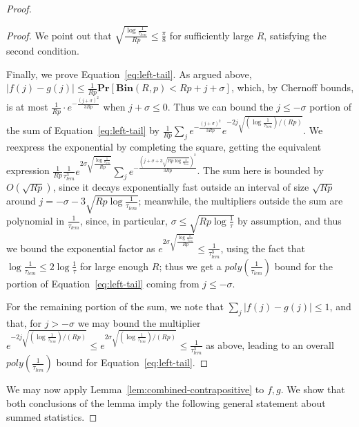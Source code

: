 \documentclass[11pt]{article}
\theoremstyle{plain}
\newcommand{\Bin}[2]{\textbf{Bin}(#1,#2)}
\renewcommand{\Pr}{\textbf{Pr}}
\begin{document}
\begin{proof}
\begin{proof}
    We point out that $\sqrt{\frac{\log\frac{1}{\tau_{lem}}}{Rp}}\leq \frac{\pi}{8}$ for sufficiently large $R$, satisfying the second condition.

    Finally, we prove Equation~\ref{eq:left-tail}. As argued above, $|f(j)-g(j)|\leq \frac{1}{Rp}\Pr[\Bin{R}{p}<Rp+j+\sigma]$, which, by Chernoff bounds, is at most $\frac{1}{Rp}\cdot e^{-\frac{(j+\sigma)^2}{3Rp}}$ when $j+\sigma\leq 0$. Thus we can bound the $j\leq -\sigma$ portion of the sum of Equation~\ref{eq:left-tail} by $\frac{1}{Rp}\sum_j e^{-\frac{(j+\sigma)^2}{3Rp}}e^{-2j\sqrt{(\log\frac{1}{\tau_{lem}})/(Rp)}}$. We reexpress the exponential by completing the square, getting the equivalent expression $\frac{1}{Rp}\frac{1}{\tau_{lem}^3}e^{2\sigma\sqrt{\frac{\log\frac{1}{\tau_{lem}}}{Rp}}}\sum_j e^{-\frac{\left(j+\sigma+3\sqrt{Rp\log\frac{1}{\tau_{lem}}}\right)^2}{3Rp}}$. The sum here is bounded by $O(\sqrt{Rp})$, since it decays exponentially fast outside an interval of size $\sqrt{Rp}$ around $j=-\sigma-3\sqrt{Rp\log\frac{1}{\tau_{lem}}}$; meanwhile, the multipliers outside the sum are polynomial in $\frac{1}{\tau_{lem}}$, since, in particular, $\sigma\leq  \sqrt{Rp\log\frac{1}{\tau}}$ by assumption, and thus we bound the exponential factor as $e^{2\sigma\sqrt{\frac{\log\frac{1}{\tau_{lem}}}{Rp}}}\leq \frac{1}{\tau_{lem}^{3 }}$, using the fact that $\log\frac{1}{\tau_{lem}}\leq 2\log\frac{1}{\tau}$ for large enough $R$; thus we get a $poly(\frac{1}{\tau_{lem}})$ bound for the portion of Equation~\ref{eq:left-tail} coming from $j\leq -\sigma$.

    For the remaining portion of the sum, we note that $\sum_j |f(j)-g(j)|\leq 1$, and that, for $j>-\sigma$ we may bound the multiplier $e^{-2j\sqrt{(\log\frac{1}{\tau_{lem}})/(Rp)}}\leq e^{2\sigma\sqrt{(\log\frac{1}{\tau_{lem}})/(Rp)}}\leq \frac{1}{\tau_{lem}^{3 }}$ as above, leading to an overall $poly(\frac{1}{\tau_{lem}})$ bound for Equation~\ref{eq:left-tail}.
\end{proof}

We may now apply Lemma~\ref{lem:combined-contrapositive} to $f,g$. We show that both conclusions of the lemma imply the following general statement about summed statistics. 


\end{proof}
\end{document}

